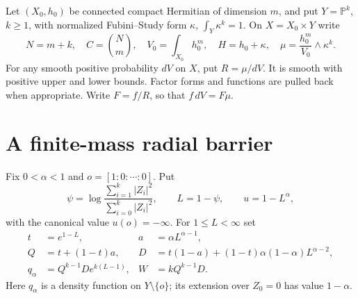 \documentclass[11pt]{article}
\newcommand{\PP}{\mathbb P}
\theoremstyle{remark}\newtheorem{remark}[theorem]{Remark}
\begin{document}
Let $(X_0,h_0)$ be connected compact Hermitian of dimension $m$,
and put $Y=\PP^k$, $k\geq1$, with normalized Fubini--Study form
$\kappa$, $\int_Y\kappa^k=1$. On $X=X_0\times Y$ write
\[
 N=m+k,\quad C=\binom Nm,\quad V_0=\int_{X_0}h_0^m,
 \quad H=h_0+\kappa,
 \quad\mu=\frac{h_0^m}{V_0}\wedge\kappa^k.
\]
For any smooth positive probability $dV$ on $X$, put $R=\mu/dV$.
It is smooth with positive upper and lower bounds. Factor forms and
functions are pulled back when appropriate. Write $F=f/R$, so that
$f\,dV=F\mu$.

\section{A finite-mass radial barrier}
Fix $0<\alpha<1$ and $o=[1:0:\cdots:0]$. Put
\[
 \psi=\log\frac{\sum_{i=1}^k|Z_i|^2}{\sum_{i=0}^k|Z_i|^2},
 \qquad L=1-\psi,\qquad u=1-L^\alpha,
\]
with the canonical value $u(o)=-\infty$. For $1\leq L<\infty$ set
\begin{align*}
 t&=e^{1-L},& a&=\alpha L^{\alpha-1},\\
 Q&=t+(1-t)a,&
 D&=t(1-a)+(1-t)\alpha(1-\alpha)L^{\alpha-2},\\
 q_\alpha&=Q^{k-1}D e^{k(L-1)},&
 W&=kQ^{k-1}D.
\end{align*}
Here $q_\alpha$ is a density function on $Y\setminus\{o\}$;
its extension over $Z_0=0$ has value $1-\alpha$.
\end{document}
